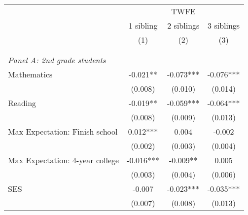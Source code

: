 \makeatletter
{}
{
\makeatother
\begin{tabular}{lccc}
\toprule
\cmidrule(lr){2-4}
& \multicolumn{3}{c}{TWFE}  \\
\cmidrule(lr){2-4}
& 1 sibling & 2 siblings & 3 siblings  \\
\cmidrule(lr){2-2} \cmidrule(lr){3-3} \cmidrule(lr){4-4}
& (1) & (2) & (3)\\
\bottomrule
&  &  &  \\
&  &  &   \\
\multicolumn{4}{l}{\textit{Panel A: 2nd grade students}} \\
\hspace{3mm}Mathematics&      -0.021** &      -0.073***&      -0.076***\\
                    &     (0.008)   &     (0.010)   &     (0.014)   \\
 
\hspace{3mm}Reading &      -0.019** &      -0.059***&      -0.064***\\
                    &     (0.008)   &     (0.009)   &     (0.013)   \\
 
\hspace{3mm}Max Expectation: Finish school&       0.012***&       0.004   &      -0.002   \\
                    &     (0.002)   &     (0.003)   &     (0.004)   \\
 
\hspace{3mm}Max Expectation: 4-year college&      -0.016***&      -0.009** &       0.005   \\
                    &     (0.003)   &     (0.004)   &     (0.006)   \\
 
\hspace{3mm}SES     &      -0.007   &      -0.023***&      -0.035***\\
                    &     (0.007)   &     (0.008)   &     (0.013)   \\
 

\end{tabular}}
